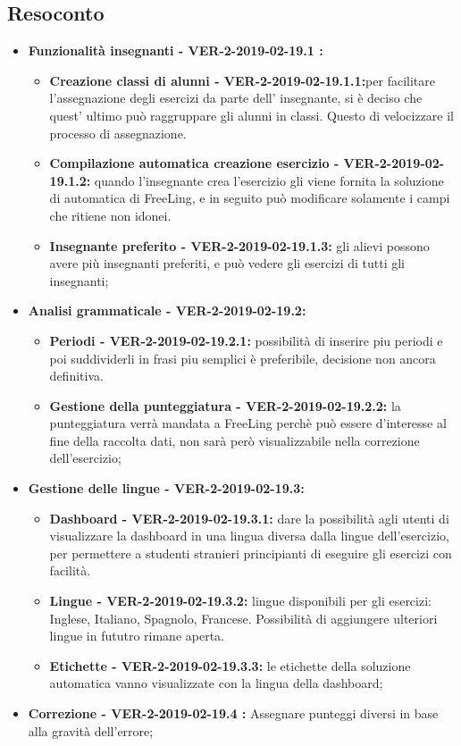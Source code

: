\documentclass[a4paper, oneside, openany, dvipsnames, table]{article}
\begin{document}
\subsection{Resoconto}
\begin{itemize}
	\item \textbf{Funzionalità insegnanti - VER-2-2019-02-19.1 :} 
	\begin{itemize}
		\item \textbf{Creazione classi di alunni - VER-2-2019-02-19.1.1:}per facilitare l'assegnazione degli esercizi da parte dell' insegnante,
		 si è deciso che quest' ultimo può raggruppare gli alunni in classi. Questo di velocizzare
		il processo di assegnazione.
		\item \textbf{Compilazione automatica creazione esercizio - VER-2-2019-02-19.1.2:}
		quando l'insegnante crea l'esercizio gli viene fornita la soluzione di automatica di FreeLing,
		e in seguito può modificare solamente i campi che ritiene non idonei.
		\item \textbf{Insegnante preferito - VER-2-2019-02-19.1.3:} 
		gli alievi possono avere più insegnanti preferiti, e può vedere gli esercizi di tutti gli insegnanti;
	\end{itemize}
	\item \textbf{Analisi grammaticale - VER-2-2019-02-19.2:}
	\begin{itemize}
		\item \textbf{Periodi - VER-2-2019-02-19.2.1:} possibilità di inserire piu periodi e poi suddividerli in frasi piu semplici è preferibile, decisione non ancora definitiva.
		\item \textbf{Gestione della punteggiatura - VER-2-2019-02-19.2.2:} la punteggiatura verrà mandata a FreeLing perchè 
		può essere d'interesse al fine della raccolta dati, non sarà però visualizzabile nella correzione dell'esercizio;
	\end{itemize}
	\item \textbf{Gestione delle lingue - VER-2-2019-02-19.3:} 
	\begin{itemize}
		\item \textbf{Dashboard - VER-2-2019-02-19.3.1:} dare la possibilità agli utenti di visualizzare la dashboard in una lingua diversa dalla lingue dell'esercizio,
		per permettere a studenti stranieri principianti di eseguire gli esercizi con facilità.
		\item \textbf{Lingue - VER-2-2019-02-19.3.2:} lingue disponibili per gli esercizi: 
		Inglese, Italiano, Spagnolo, Francese. Possibilità di aggiungere ulteriori lingue in fututro rimane aperta.
		\item \textbf{Etichette - VER-2-2019-02-19.3.3:} le etichette della soluzione automatica
		vanno visualizzate con la lingua della dashboard;
	\end{itemize}
	\item \textbf{Correzione - VER-2-2019-02-19.4 :} 
	Assegnare punteggi diversi in base alla gravità dell'errore;
	

\end{itemize}
\end{document}
